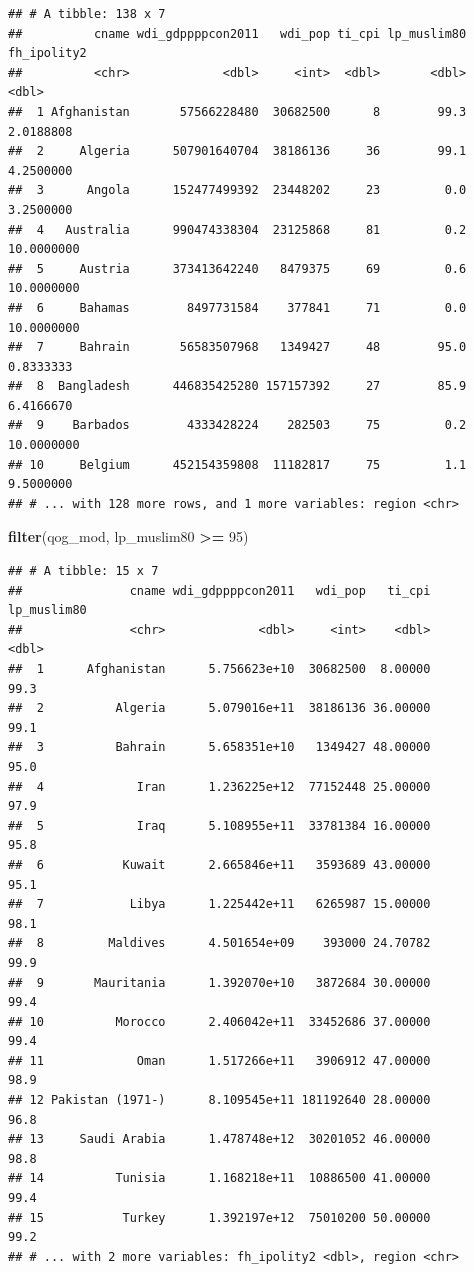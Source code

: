 \documentclass[]{book}
\newenvironment{Shaded}{\begin{snugshade}}{\end{snugshade}}
\newcommand{\KeywordTok}[1]{\textcolor[rgb]{0.13,0.29,0.53}{\textbf{#1}}}
\newcommand{\DecValTok}[1]{\textcolor[rgb]{0.00,0.00,0.81}{#1}}
\newcommand{\StringTok}[1]{\textcolor[rgb]{0.31,0.60,0.02}{#1}}
\newcommand{\OperatorTok}[1]{\textcolor[rgb]{0.81,0.36,0.00}{\textbf{#1}}}
\newcommand{\NormalTok}[1]{#1}
\begin{document}
\begin{verbatim}
## # A tibble: 138 x 7
##          cname wdi_gdppppcon2011   wdi_pop ti_cpi lp_muslim80 fh_ipolity2
##          <chr>             <dbl>     <int>  <dbl>       <dbl>       <dbl>
##  1 Afghanistan       57566228480  30682500      8        99.3   2.0188808
##  2     Algeria      507901640704  38186136     36        99.1   4.2500000
##  3      Angola      152477499392  23448202     23         0.0   3.2500000
##  4   Australia      990474338304  23125868     81         0.2  10.0000000
##  5     Austria      373413642240   8479375     69         0.6  10.0000000
##  6     Bahamas        8497731584    377841     71         0.0  10.0000000
##  7     Bahrain       56583507968   1349427     48        95.0   0.8333333
##  8  Bangladesh      446835425280 157157392     27        85.9   6.4166670
##  9    Barbados        4333428224    282503     75         0.2  10.0000000
## 10     Belgium      452154359808  11182817     75         1.1   9.5000000
## # ... with 128 more rows, and 1 more variables: region <chr>
\end{verbatim}

\begin{Shaded}
\begin{Highlighting}[]
\KeywordTok{filter}\NormalTok{(qog_mod, lp_muslim80 }\OperatorTok{>=}\StringTok{ }\DecValTok{95}\NormalTok{)}
\end{Highlighting}
\end{Shaded}

\begin{verbatim}
## # A tibble: 15 x 7
##               cname wdi_gdppppcon2011   wdi_pop   ti_cpi lp_muslim80
##               <chr>             <dbl>     <int>    <dbl>       <dbl>
##  1      Afghanistan      5.756623e+10  30682500  8.00000        99.3
##  2          Algeria      5.079016e+11  38186136 36.00000        99.1
##  3          Bahrain      5.658351e+10   1349427 48.00000        95.0
##  4             Iran      1.236225e+12  77152448 25.00000        97.9
##  5             Iraq      5.108955e+11  33781384 16.00000        95.8
##  6           Kuwait      2.665846e+11   3593689 43.00000        95.1
##  7            Libya      1.225442e+11   6265987 15.00000        98.1
##  8         Maldives      4.501654e+09    393000 24.70782        99.9
##  9       Mauritania      1.392070e+10   3872684 30.00000        99.4
## 10          Morocco      2.406042e+11  33452686 37.00000        99.4
## 11             Oman      1.517266e+11   3906912 47.00000        98.9
## 12 Pakistan (1971-)      8.109545e+11 181192640 28.00000        96.8
## 13     Saudi Arabia      1.478748e+12  30201052 46.00000        98.8
## 14          Tunisia      1.168218e+11  10886500 41.00000        99.4
## 15           Turkey      1.392197e+12  75010200 50.00000        99.2
## # ... with 2 more variables: fh_ipolity2 <dbl>, region <chr>
\end{verbatim}
\end{document}
